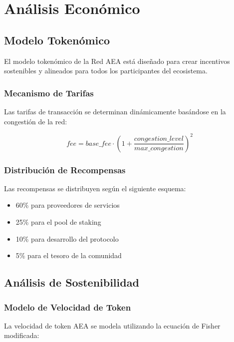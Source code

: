 \documentclass[12pt,a4paper]{article}
\begin{document}
\section{Análisis Económico}

\subsection{Modelo Tokenómico}

El modelo tokenómico de la Red AEA está diseñado para crear incentivos sostenibles y alineados para todos los participantes del ecosistema.

\subsubsection{Mecanismo de Tarifas}

Las tarifas de transacción se determinan dinámicamente basándose en la congestión de la red:

\begin{equation}
fee = base\_fee \cdot (1 + \frac{congestion\_level}{max\_congestion})^2
\end{equation}

\subsubsection{Distribución de Recompensas}

Las recompensas se distribuyen según el siguiente esquema:
\begin{itemize}
\item 60\% para proveedores de servicios
\item 25\% para el pool de staking
\item 10\% para desarrollo del protocolo
\item 5\% para el tesoro de la comunidad
\end{itemize}

\subsection{Análisis de Sostenibilidad}

\subsubsection{Modelo de Velocidad de Token}

La velocidad de token AEA se modela utilizando la ecuación de Fisher modificada:
\end{document}
